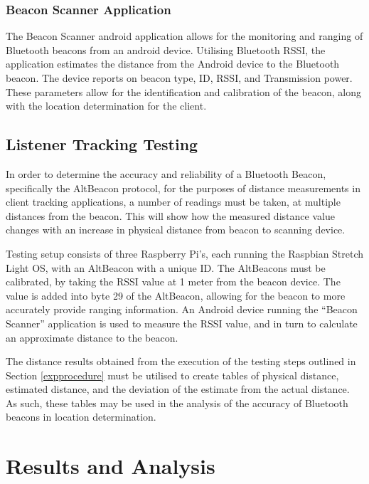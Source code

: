 \documentclass[11pt,a4paper,headinclude=false,footinclude=false]{scrreprt}
\begin{document}
\subsection{Beacon Scanner
Application}\label{beacon-scanner-application}

The Beacon Scanner android application allows for the monitoring and
ranging of Bluetooth beacons from an android device\cite{beaconscan}.
Utilising Bluetooth RSSI, the application estimates the distance from
the Android device to the Bluetooth beacon. The device reports on beacon
type, ID, RSSI, and Transmission power. These parameters allow for the
identification and calibration of the beacon, along with the location
determination for the client.

\section{Listener Tracking Testing}\label{listener-tracking-testing}

In order to determine the accuracy and reliability of a Bluetooth
Beacon, specifically the AltBeacon protocol, for the purposes of
distance measurements in client tracking applications, a number of
readings must be taken, at multiple distances from the beacon. This will
show how the measured distance value changes with an increase in
physical distance from beacon to scanning device.

Testing setup consists of three Raspberry Pi's, each running the
Raspbian Stretch Light OS, with an AltBeacon with a unique ID. The
AltBeacons must be calibrated, by taking the RSSI value at 1 meter from
the beacon device. The value is added into byte 29 of the AltBeacon,
allowing for the beacon to more accurately provide ranging information.
An Android device running the ``Beacon Scanner'' application is used to
measure the RSSI value, and in turn to calculate an approximate distance
to the beacon.

The distance results obtained from the execution of the testing steps
outlined in Section \ref{expprocedure} must be utilised to create tables
of physical distance, estimated distance, and the deviation of the
estimate from the actual distance. As such, these tables may be used in
the analysis of the accuracy of Bluetooth beacons in location
determination.

\chapter{Results and Analysis}\label{results-and-analysis}
\end{document}
